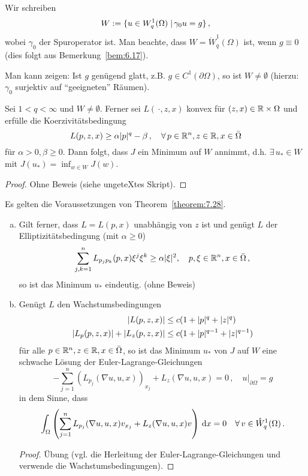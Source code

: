 \begin{notation}
Wir schreiben
\[
	W := \{u \in W^1_q(\Omega) \;\vert\, \gamma_0 u = g\} \, ,
\]
wobei $\gamma_0$ der Spuroperator ist. Man beachte, dass $W = \mathring W^1_q(\Omega)$ ist, wenn $g \equiv 0$ (dies folgt aus Bemerkung~\ref{bem:6.17}).

Man kann zeigen: Ist $g$ genügend glatt, z.B. $g \in C^1(\partial \Omega)$, so ist $W \neq \emptyset$ (hierzu: $\gamma_0$ surjektiv auf "`geeigneten"' Räumen).
\end{notation}

\begin{theorem}
\label{theorem:7.28}
Sei $1 < q < \infty$ und $W\neq \emptyset$. Ferner sei $L(\, \cdot , z, x)$ konvex für $(z,x) \in \mathbb{R} \times \Omega$ und erfülle die Koerzivitätsbedingung
\[
	L(p, z, x) \geq \alpha \lvert p\rvert^q-\beta \, , \quad \forall \, p \in \mathbb{R}^n, z\in  \mathbb{R}, x \in \bar\Omega
\]	
für $\alpha > 0, \beta \geq 0$. Dann folgt, dass $J$ ein Minimum auf $W$ annimmt, d.h. $\exists \, u_\ast \in W$ mit $J(u_\ast) = \inf_{w \in W} J(w)$.
\end{theorem}

\begin{proof}
Ohne Beweis (siehe  ungeteXtes Skript).
\end{proof}

\begin{bem}
\label{bem:7.29}
Es gelten die Voraussetzungen von Theorem~\ref{theorem:7.28}.
\begin{enumerate}[(a)]
\item Gilt ferner, dass $L = L(p,x)$ unabhängig von $z$ ist und genügt $L$ der Elliptizitätsbedingung (mit $\alpha \geq 0$)
\[
	\sum_{j,k=1}^n L_{p_jp_k} (p,x) \xi^j\xi^k \geq \alpha \lvert \xi\rvert^2 , \quad p, \xi \in \mathbb{R}^n, x \in \bar \Omega \, ,
\]
so ist das Minimum $u_\ast$ eindeutig. (ohne Beweis)
\item Genügt $L$ den Wachstumsbedingungen
\begin{align*}
\lvert L(p,z,x)\rvert & \leq c(1+\lvert p\rvert^q + \lvert z\rvert^q) \\
\lvert L_p(p,z,x)\rvert+ \lvert L_z(p,z,x)\rvert & \leq c(1+\lvert p\rvert^{q-1} + \lvert z\rvert^{q-1})
\end{align*}
für alle $p \in \mathbb{R}^n, z \in \mathbb{R}, x \in \bar\Omega$, so ist das Minimum $u_\ast$ von $J$ auf $W$ eine schwache Lösung der Euler-Lagrange-Gleichungen
\[
	- \sum_{j=1}^n (L_{p_j} (\nabla u, u, x))_{x_j} + L_z (\nabla u, u, x) = 0 \, , \quad u |_{\partial \Omega} = g
\]
in dem Sinne, dass
\[
	\int_\Omega\left( \sum_{j=1}^n L_{p_j} (\nabla u, u, x) v_{x_j} + L_z (\nabla u, u, x) v\right) \,\mathrm{d} x = 0 \quad \forall \, v \in \mathring W^1_q (\Omega) \, .
\]
\begin{proof}
Übung (vgl. die Herleitung der Euler-Lagrange-Gleichungen und verwende die Wachstumsbedingungen).
\end{proof}
\end{enumerate}
\end{bem}

